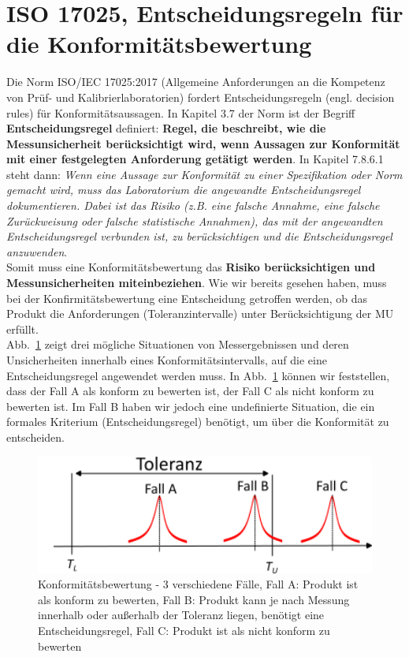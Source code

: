 \section{ISO 17025, Entscheidungsregeln für die Konformitätsbewertung}
Die Norm ISO/IEC 17025:2017 (Allgemeine Anforderungen an die Kompetenz von Prüf- und Kalibrierlaboratorien) fordert
Entscheidungsregeln (engl. decision rules) für Konformitätsaussagen. In Kapitel 3.7 der Norm ist der Begriff \textbf{Entscheidungsregel} definiert: \textbf{Regel, die beschreibt, wie die Messunsicherheit berücksichtigt wird, wenn Aussagen zur Konformität mit einer festgelegten Anforderung getätigt werden}. In Kapitel 7.8.6.1 steht dann:\textit{ Wenn eine Aussage zur Konformität zu einer Spezifikation oder Norm gemacht wird, muss das Laboratorium die angewandte Entscheidungsregel dokumentieren. Dabei ist das Risiko (z.B. eine falsche Annahme, eine falsche Zurückweisung oder falsche statistische Annahmen), das mit der angewandten Entscheidungsregel verbunden ist, zu berücksichtigen und die Entscheidungsregel anzuwenden}. \\
Somit muss eine Konformitätsbewertung das \textbf{Risiko berücksichtigen und Messunsicherheiten miteinbeziehen}. 
Wie wir bereits gesehen haben, muss bei der Konfirmitätsbewertung eine Entscheidung getroffen werden, ob das Produkt die Anforderungen (Toleranzintervalle) unter Berücksichtigung der MU erfüllt.\\ 
Abb.~\ref{fig:konform3Faelle} zeigt drei mögliche Situationen von Messergebnissen und deren Unsicherheiten innerhalb eines Konformitätsintervalls, auf die eine Entscheidungsregel angewendet werden muss. In Abb.~\ref{fig:konform3Faelle} können wir feststellen, dass der Fall A als konform zu bewerten ist, der Fall C als nicht konform zu bewerten ist. Im Fall B haben wir jedoch eine undefinierte Situation, die ein formales Kriterium (Entscheidungsregel) benötigt, um über die Konformität zu entscheiden.
\begin{figure}
	\begin{center}
		\includegraphics[width=120mm]{06_vorlesung/media/Konform_3_Faelle.png}
		\caption{Konformitätsbewertung - 3 verschiedene Fälle, Fall A: Produkt ist als konform zu bewerten, Fall B: Produkt kann je nach Messung innerhalb oder außerhalb der Toleranz liegen, benötigt eine  Entscheidungsregel,  Fall C: Produkt ist als nicht konform zu bewerten}
		\label{fig:konform3Faelle}
	\end{center}
\end{figure}

